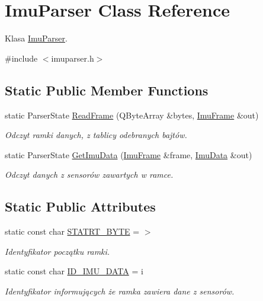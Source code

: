\hypertarget{class_imu_parser}{}\section{Imu\+Parser Class Reference}
\label{class_imu_parser}


Klasa \mbox{\hyperlink{class_imu_parser}{Imu\+Parser}}.  




{\ttfamily \#include $<$imuparser.\+h$>$}

\subsection*{Static Public Member Functions}
\begin{DoxyCompactItemize}
\item 
static Parser\+State \mbox{\hyperlink{class_imu_parser_ac1e6cd15ce85021883c68fcee7c5cb55}{Read\+Frame}} (Q\+Byte\+Array \&bytes, \mbox{\hyperlink{struct_imu_frame}{Imu\+Frame}} \&out)
\begin{DoxyCompactList}\small\item\em Odczyt ramki danych, z tablicy odebranych bajtów. \end{DoxyCompactList}\item 
static Parser\+State \mbox{\hyperlink{class_imu_parser_abd16c928d85e81a5dd475befdb604c9b}{Get\+Imu\+Data}} (\mbox{\hyperlink{struct_imu_frame}{Imu\+Frame}} \&frame, \mbox{\hyperlink{struct_imu_data}{Imu\+Data}} \&out)
\begin{DoxyCompactList}\small\item\em Odczyt danych z sensorów zawartych w ramce. \end{DoxyCompactList}\end{DoxyCompactItemize}
\subsection*{Static Public Attributes}
\begin{DoxyCompactItemize}
\item 
\mbox{\label{class_imu_parser_abba951816e299787b38ca488664bfd4c}} 
static const char \mbox{\hyperlink{class_imu_parser_abba951816e299787b38ca488664bfd4c}{S\+T\+A\+T\+R\+T\+\_\+\+B\+Y\+TE}} = \textquotesingle{}$>$\textquotesingle{}
\begin{DoxyCompactList}\small\item\em Identyfikator początku ramki. \end{DoxyCompactList}\item 
\mbox{\label{class_imu_parser_af90703b4dbcf80749b70506de7531625}} 
static const char \mbox{\hyperlink{class_imu_parser_af90703b4dbcf80749b70506de7531625}{I\+D\+\_\+\+I\+M\+U\+\_\+\+D\+A\+TA}} = \textquotesingle{}i\textquotesingle{}
\begin{DoxyCompactList}\small\item\em Identyfikator informujących że ramka zawiera dane z sensorów. \end{DoxyCompactList}\end{DoxyCompactItemize}


